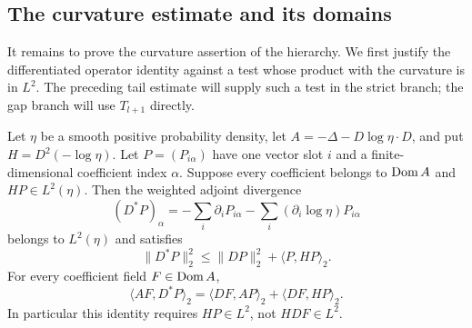 \subsection{The curvature estimate and its domains}

It remains to prove the curvature assertion of the hierarchy.
We first justify the differentiated operator identity against a test
whose product with the curvature is in $L^2$. The preceding tail
estimate will supply such a test in the strict branch; the gap branch
will use $T_{l+1}$ directly.

\begin{samepage}
\begin{lemma}
\label{lem:hierarchy-divergence}
Let $\eta$ be a smooth positive probability density, let
$A=-\Delta-D\log\eta\cdot D$, and put $H=D^2(-\log\eta)$.
Let $P=(P_{i\alpha})$ have one vector slot $i$ and a finite-dimensional
coefficient index $\alpha$.  Suppose every coefficient belongs to
$\operatorname{Dom} A$ and $HP\in L^2(\eta)$.  Then the weighted adjoint divergence
\[
 (D^*P)_\alpha=-\sum_i\partial_iP_{i\alpha}
                   -\sum_i(\partial_i\log\eta)P_{i\alpha}
\]
belongs to $L^2(\eta)$ and satisfies
\begin{equation}\label{eq:hierarchy-divergence-bound}
 \|D^*P\|_2^2\le\|DP\|_2^2+\langle P,HP\rangle_2.
\end{equation}
For every coefficient field $F\in\operatorname{Dom} A$,
\begin{equation}\label{eq:hierarchy-differentiated-operator}
 \langle AF,D^*P\rangle_2
 =\langle DF,AP\rangle_2+\langle DF,HP\rangle_2.
\end{equation}
In particular this identity requires $HP\in L^2$, not $HDF\in L^2$.
\end{lemma}
\end{samepage}

